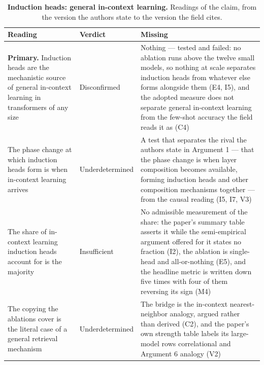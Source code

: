 \clearpage
\begin{table}[H]
\centering
\footnotesize
\caption{\textbf{Induction heads: general in-context learning.} Readings of the claim, from the version the authors state to the version the
field cites.}
\label{tab:induction_broad-readings}
\renewcommand{\arraystretch}{1.18}
\begin{tabular}{@{}>{\raggedright\arraybackslash}p{3.3cm}l>{\raggedright\arraybackslash}p{4.4cm}@{}}
\toprule
\textbf{Reading} & \textbf{Verdict} & \textbf{Missing} \\
\midrule
\textbf{Primary.} Induction heads are the mechanistic source of general in-context learning in transformers of any size
  & Disconfirmed
  & Nothing --- tested and failed: no ablation runs above the twelve small models, so nothing at scale separates induction heads from whatever else forms alongside them (E4, I5), and the adopted measure does not separate general in-context learning from the few-shot accuracy the field reads it as (C4) \\
\addlinespace[2pt]
The phase change at which induction heads form is when in-context learning arrives
  & Underdetermined
  & A test that separates the rival the authors state in Argument 1 --- that the phase change is when layer composition becomes available, forming induction heads and other composition mechanisms together --- from the causal reading (I5, I7, V3) \\
\addlinespace[2pt]
The share of in-context learning induction heads account for is the majority
  & Insufficient
  & No admissible measurement of the share: the paper's summary table asserts it while the semi-empirical argument offered for it states no fraction (I2), the ablation is single-head and all-or-nothing (E5), and the headline metric is written down five times with four of them reversing its sign (M4) \\
\addlinespace[2pt]
The copying the ablations cover is the literal case of a general retrieval mechanism
  & Underdetermined
  & The bridge is the in-context nearest-neighbor analogy, argued rather than derived (C2), and the paper's own strength table labels its large-model rows correlational and Argument 6 analogy (V2) \\
\bottomrule
\end{tabular}
\end{table}

